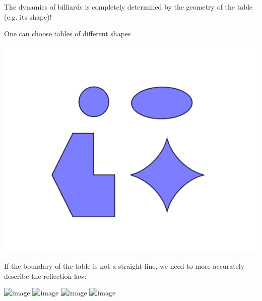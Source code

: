 \documentclass[compress,aspectratio=169,10pt,usenames,dvipsnames]{beamer}
\begin{document}

\begin{frame}
The dynamics of billiards is completely determined by the geometry of the table (e.g. its shape)!

\vskip10pt

One can choose tables of different shapes

\begin{center}
\includegraphics[scale=1.0]{SampleTables}
\end{center}

\end{frame}


\begin{frame}
If the boundary of the table is not a straight line, we need to more accurately describe the reflection law:


\begin{center}
\begin{overlayarea}{7cm}{4.5cm}
\includegraphics<1>[width=\textwidth]{EllipticalTable1a}
\includegraphics<2>[width=\textwidth]{EllipticalTable2a}
\includegraphics<3>[width=\textwidth]{EllipticalTable3a}
\includegraphics<4->[width=\textwidth]{EllipticalTable4a}
\end{overlayarea}
\end{center}
\end{frame}
\end{document}
